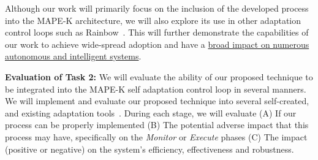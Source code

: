 \documentclass[12pt]{article}
\begin{document}
Although our work will primarily focus on the inclusion of the developed process into the MAPE-K architecture, we will also explore its use in other adaptation control loops such as Rainbow~\cite{garlan2004rainbow}. This will further demonstrate the capabilities of our work to achieve wide-spread adoption and have a \ul{broad impact on numerous autonomous and intelligent systems}.












\vspace{2mm} \noindent \textbf{Evaluation of Task 2:} We will evaluate the ability of our proposed technique to be integrated into the MAPE-K self adaptation control loop in several manners. We will implement and evaluate our proposed technique into several self-created, and existing adaptation tools~\cite{moreno2018swim, Rubis_URL}. During each stage, we will evaluate (A) If our process can be properly implemented (B) The potential adverse impact that this process may have, specifically on the \emph{Monitor} or \emph{Execute} phases (C) The impact (positive or negative) on the system's efficiency, effectiveness and robustness. 
\end{document}
